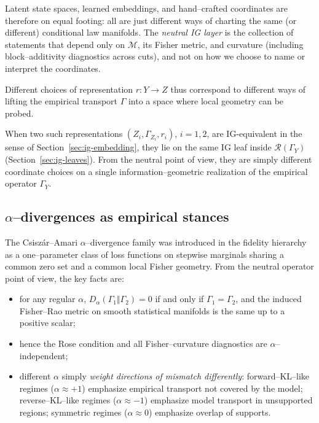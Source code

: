 \documentclass[11pt]{article}
\newcommand{\1}{\mathbf{1}}
\begin{document}
Latent state spaces, learned embeddings, and hand–crafted coordinates are therefore on equal footing: all are just different ways of charting the same (or different) conditional law manifolds. The \emph{neutral IG layer} is the collection of statements that depend only on \(\mathcal{M}\), its Fisher metric, and curvature (including block–additivity diagnostics across cuts), and not on how we choose to name or interpret the coordinates.

Different choices of representation $r:Y\to Z$ thus correspond to different ways of lifting the empirical transport $\Gamma$ into a space where local geometry can be probed.

When two such representations $(Z_i,\Gamma_{Z_i},r_i)$, $i=1,2$, are IG-equivalent in the sense of Section~\ref{sec:ig-embedding}, they lie on the same IG leaf inside $\mathcal{R}(\Gamma_Y)$ (Section~\ref{sec:ig-leaves}). From the neutral point of view, they are simply different coordinate choices on a single information--geometric realization of the empirical operator $\Gamma_Y$.

\subsection{\texorpdfstring{\(\alpha\)}{alpha}–divergences as empirical stances}
\label{sec:alpha-stances}

The Csiszár–Amari \(\alpha\)–divergence family was introduced in the fidelity hierarchy as a one–parameter class of loss functions on stepwise marginals sharing a common zero set and a common local Fisher geometry. From the neutral operator point of view, the key facts are:

\begin{itemize}
  \item for any regular \(\alpha\), \(D_\alpha(\Gamma_1 \Vert \Gamma_2) = 0\) if and only if
        \(\Gamma_1 = \Gamma_2\), and the induced Fisher–Rao metric on smooth statistical manifolds is
        the same up to a positive scalar;
  \item hence the Rose condition and all Fisher–curvature diagnostics are \(\alpha\)–independent;
  \item different \(\alpha\) simply \emph{weight directions of mismatch differently}:
        forward–KL–like regimes (\(\alpha \approx +1\)) emphasize empirical transport not covered by
        the model; reverse–KL–like regimes (\(\alpha \approx -1\)) emphasize model transport in
        unsupported regions; symmetric regimes (\(\alpha \approx 0\)) emphasize overlap of supports.
\end{itemize}
\end{document}
